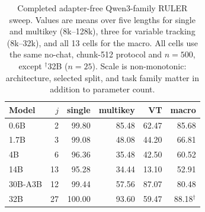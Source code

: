 \begin{table}[t]
\centering
\small
\setlength{\tabcolsep}{4pt}
\begin{tabular}{@{}lrrrrr@{}}
\toprule
\textbf{Model} & \textbf{$j$} & \textbf{single} & \textbf{multikey} & \textbf{VT} & \textbf{macro} \\
\midrule
0.6B & 2  & 99.80 & 85.48 & 62.47 & 85.68 \\
1.7B & 3  & 99.08 & 48.08 & 44.20 & 66.81 \\
4B   & 6  & 96.36 & 35.48 & 42.50 & 60.52 \\
14B  & 13 & 95.28 & 34.44 & 13.10 & 52.91 \\
30B-A3B & 12 & 99.44 & 57.56 & 87.07 & 80.48 \\
32B  & 27 & 100.00 & 93.60 & 59.47 & 88.18$^\dagger$ \\
\bottomrule
\end{tabular}
\caption{Completed adapter-free Qwen3-family RULER sweep. Values are means over
five lengths for single and multikey (8k--128k), three for variable tracking
(8k--32k), and all 13 cells for the macro. All cells use the same no-chat,
chunk-512 protocol and $n{=}500$, except $^\dagger$32B ($n{=}25$). Scale is
non-monotonic: architecture, selected split, and task family matter in addition
to parameter count.}
\label{tab:scale}
\end{table}
